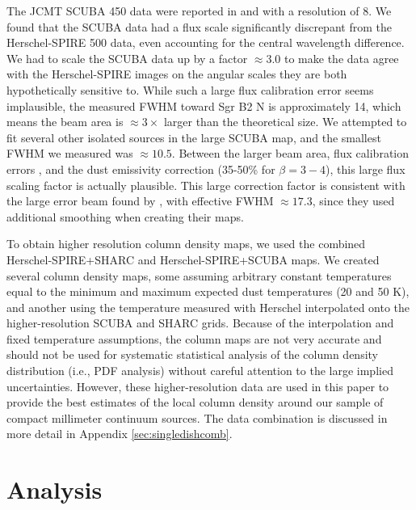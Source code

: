 \documentclass[twocolumn]{aastex61}
\newcommand{\percent}{\%\xspace}
\begin{document}
The JCMT SCUBA 450 \um data were reported in \citet{Pierce-Price2000a} and
\citet{di-Francesco2008a} with a resolution of 8\arcsec.  We found that the
SCUBA data had a flux scale significantly discrepant from the Herschel-SPIRE 500 \um data,
even accounting for the central wavelength difference.  We had to scale the
SCUBA data up by a factor $\approx3.0$ to make the data agree with the Herschel-SPIRE
images on the angular scales they are both hypothetically sensitive to.
While such a large flux calibration error seems implausible, the measured
FWHM toward Sgr B2 N is approximately 14\arcsec, which means the beam area is $\approx3\times$
larger than the theoretical size.  We attempted to fit several other isolated
sources in the large SCUBA map, and the smallest FWHM we measured was
$\approx10.5$\arcsec.  Between the larger beam area, flux calibration errors
\citep[quoted at
20\percent in][]{Pierce-Price2000a}, and the dust emissivity correction
(35-50\percent for $\beta=3-4$), this large flux scaling factor is actually
plausible. This large correction factor is consistent with the large error beam
found by \citet{di-Francesco2008a}, with effective FWHM $\approx17.3$\arcsec,
since they used additional smoothing when creating their maps.


To obtain higher resolution column density maps, we used the combined
Herschel-SPIRE+SHARC and Herschel-SPIRE+SCUBA maps.
We created several column density maps, some assuming arbitrary constant
temperatures equal to the minimum and maximum expected dust temperatures (20
and 50 K), and another using the temperature measured with Herschel
interpolated onto the higher-resolution SCUBA and SHARC grids.  Because of the
interpolation and fixed temperature assumptions, the column maps are not very
accurate and should not be used for systematic statistical analysis of the
column density distribution (i.e., PDF analysis) without careful attention to
the large implied
uncertainties.  However, these higher-resolution data are used in this paper
to provide the best estimates of the local column density around our sample
of compact millimeter continuum sources.
The data combination is discussed in more detail in Appendix
\ref{sec:singledishcomb}.

\section{Analysis}
\end{document}
